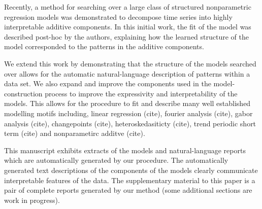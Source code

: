 \documentclass[twoside]{article}
\begin{document}
Recently, a method for searching over a large class of structured nonparametric regression models \citep{DuvLloGroetal13} was demonstrated to decompose time series into highly interpretable additive components.
In this initial work, the fit of the model was described post-hoc by the authors, explaining how the learned structure of the model corresponded to the patterns in the additive components.


We extend this work by demonstrating that the structure of the models searched over allows for the automatic natural-language description of patterns within a data set.
We also expand and improve the components used in the model-construction process to improve the expressivity and interpretability of the models.
This allows for the procedure to fit and describe many well established modelling motifs including, linear regression (cite), fourier analysis (cite), gabor analysis (cite), changepoints (cite), heteroskedasiticty (cite), trend periodic short term (cite) and nonparametirc additve (cite).

This manuscript exhibits extracts of the models and natural-language reports which are automatically generated by our procedure.
The automatically generated text descriptions of the components of the models clearly communicate interpretable features of the data.
The supplementary material to this paper is a pair of complete reports generated by our method (some additional sections are work in progress).
\end{document}
